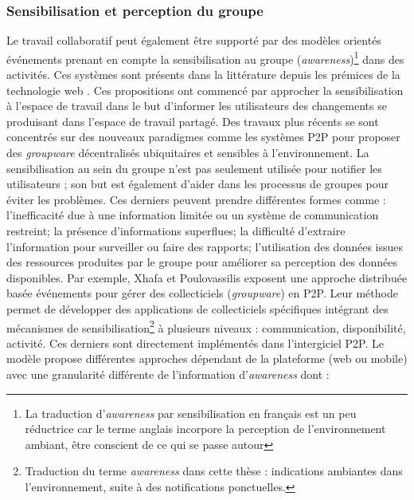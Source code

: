 \subsubsection{Sensibilisation et perception du groupe}
Le travail collaboratif peut également être supporté par des modèles orientés 
événements prenant en compte la sensibilisation au groupe (\textit{awareness})\footnote{La traduction d'\textit{awareness} par sensibilisation en français est un peu réductrice car le terme anglais incorpore la perception de l'environnement ambiant, être conscient de ce qui se passe autour} 
dans des activités. Ces systèmes sont présents dans la littérature depuis les 
prémices de la technologie web \cite{Bentley1997,Steinfield1999,You2001}. Ces 
propositions ont commencé par approcher la sensibilisation à l'espace de travail 
dans le but d'informer les utilisateurs des changements se produisant dans 
l'espace 
de travail partagé. 
Des travaux plus récents se sont concentrés sur des 
nouveaux paradigmes comme les systèmes \gls{P2P} pour proposer des 
\textit{groupware} décentralisés ubiquitaires et sensibles à l'environnement. La 
sensibilisation au sein du groupe n'est pas seulement utilisée 
pour notifier les utilisateurs ; son but est également d'aider dans les processus de 
groupes pour éviter les problèmes. Ces derniers peuvent prendre différentes 
formes comme :  l'inefficacité due à une information limitée ou un 
système de communication restreint; la présence d'informations superflues; la difficulté 
d'extraire l'information pour surveiller ou faire des rapports; l'utilisation des 
données issues des ressources produites par le groupe pour améliorer sa 
perception des données disponibles. Par exemple, Xhafa et Poulovassilis 
\cite{Xhafa2010} exposent une approche distribuée basée événements pour gérer 
des collecticiels (\textit{groupware}) en \gls{P2P}. 
Leur méthode permet de développer des applications de collecticiels spécifiques  
intégrant des mécanismes de sensibilisation\footnote{Traduction du terme 
\textit{awareness} dans cette thèse : indications ambiantes dans l'environnement, 
suite à des notifications ponctuelles.} à plusieurs niveaux : communication, 
disponibilité, activité. Ces derniers 
sont directement implémentés dans l'intergiciel \gls{P2P}. Le modèle propose 
différentes approches dépendant de la plateforme (web ou mobile) avec une 
granularité différente de l'information 
d'\textit{awareness} dont :

